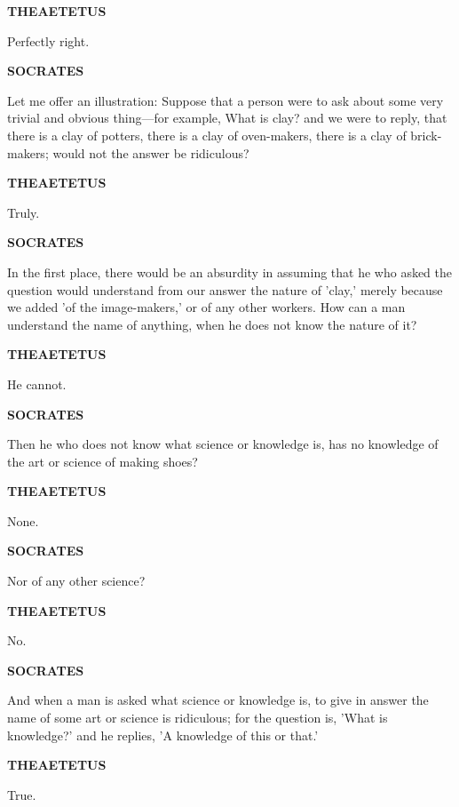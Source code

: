 \documentclass[11pt,letter]{article}
\begin{document}
\par \textbf{THEAETETUS}
\par   Perfectly right.

\par \textbf{SOCRATES}
\par   Let me offer an illustration:  Suppose that a person were to ask about some very trivial and obvious thing—for example, What is clay? and we were to reply, that there is a clay of potters, there is a clay of oven-makers, there is a clay of brick-makers; would not the answer be ridiculous?

\par \textbf{THEAETETUS}
\par   Truly.

\par \textbf{SOCRATES}
\par   In the first place, there would be an absurdity in assuming that he who asked the question would understand from our answer the nature of 'clay,' merely because we added 'of the image-makers,' or of any other workers. How can a man understand the name of anything, when he does not know the nature of it?

\par \textbf{THEAETETUS}
\par   He cannot.

\par \textbf{SOCRATES}
\par   Then he who does not know what science or knowledge is, has no knowledge of the art or science of making shoes?

\par \textbf{THEAETETUS}
\par   None.

\par \textbf{SOCRATES}
\par   Nor of any other science?

\par \textbf{THEAETETUS}
\par   No.

\par \textbf{SOCRATES}
\par   And when a man is asked what science or knowledge is, to give in answer the name of some art or science is ridiculous; for the question is, 'What is knowledge?' and he replies, 'A knowledge of this or that.'

\par \textbf{THEAETETUS}
\par   True.
\end{document}
